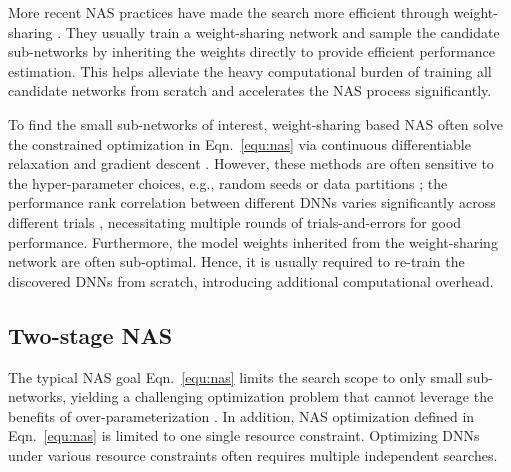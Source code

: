 \documentclass[final]{cvpr}
\theoremstyle{definition}
\begin{document}
More recent NAS practices have made the search more efficient through weight-sharing \cite{pham2018efficient, stamoulis2019single, liu2018darts, cai2018proxylessnas}.
They usually train a weight-sharing network and sample the candidate sub-networks by inheriting the weights directly to provide efficient performance estimation.
This helps alleviate the heavy computational burden of training all candidate networks from scratch and accelerates the NAS process significantly.

To find the small sub-networks of interest, 
weight-sharing based NAS often solve the constrained optimization in Eqn.~\eqref{equ:nas} via continuous differentiable relaxation and gradient descent \cite{liu2018darts, wu2019fbnet}.  
However, these methods are often sensitive to the hyper-parameter choices, e.g., random seeds or data partitions \cite{dong2020bench, ying2019bench}; the performance rank correlation between different DNNs varies significantly across different trials \cite{yang2019evaluation}, necessitating multiple rounds of trials-and-errors for good performance.    
Furthermore, the model weights inherited from the weight-sharing network are often sub-optimal. Hence, it is usually required to re-train the discovered DNNs from scratch, introducing additional computational overhead.



\iffalse
Most existing NAS methods are based on black-box optimization
techniques, including reinforcement learning \cite{zoph2016neural}
and evolutionary algorithms \cite{}.  
However, these methods are often extremely time-consuming due to
the enormous search space of possible architectures and the high cost for evaluating the performance of each candidate network. More recent approaches have made the search more efficient by using
weight-sharing \cite{cai2018proxylessnas, pham2018efficient, liu2018darts, wu2019fbnet}.
\fi

\subsection{Two-stage NAS}
The typical NAS goal Eqn.~\eqref{equ:nas} limits the search scope to only small sub-networks, yielding a challenging optimization problem that cannot leverage the benefits of over-parameterization \cite{allen2019convergence, cao2019generalization}.
In addition, NAS optimization defined in Eqn.~\eqref{equ:nas} is limited to one single resource constraint. Optimizing DNNs under various resource constraints often requires multiple independent searches. 
\end{document}
